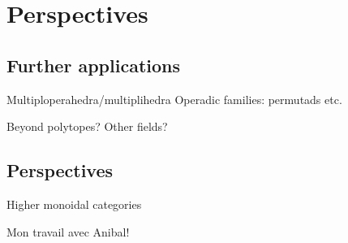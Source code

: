 
\section{Perspectives} 
\label{s:applications}

\subsection{Further applications}

Multiploperahedra/multiplihedra
Operadic families: permutads etc.

Beyond polytopes? Other fields?


\subsection{Perspectives}

Higher monoidal categories

Mon travail avec Anibal!



